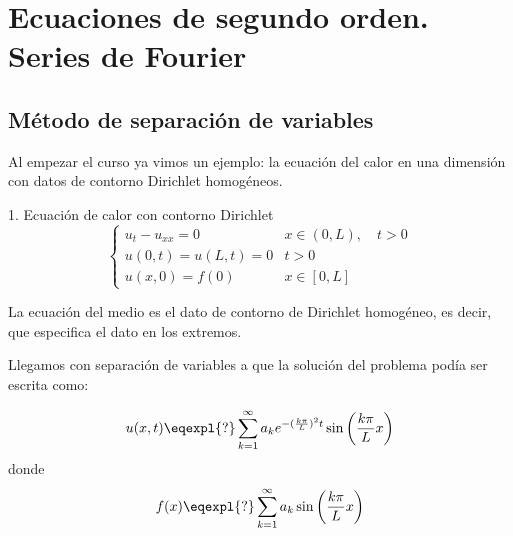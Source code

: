 \chapter{Ecuaciones de segundo orden. Series de Fourier}
\label{chap:EcuacionesSegundoOrden}

\section{Método de separación de variables}

	Al empezar el curso ya vimos un ejemplo: la ecuación del calor en una dimensión con datos de contorno Dirichlet homogéneos.

	\begin{example}{1. Ecuación de calor con contorno Dirichlet}
		\[
		\begin{cases}
		u_t - u_{xx} = 0 & x \in (0,L), \quad t > 0 \\
		u(0,t) = u(L,t) = 0 & t > 0 \\
		u(x,0) = f(0) & x \in [0,L]
		\end{cases}
		\]

		La ecuación del medio es el dato de contorno de Dirichlet homogéneo, es decir, que especifica el dato en los extremos.

		Llegamos con separación de variables a que la solución del problema podía ser escrita como:

		\[ u(x,t) \eqexpl{?} \sum^{\infty}_{k=1} a_k e^{-(\frac{k\pi}{L})^2 t} \sin \left( \frac{k\pi}{L} x \right) \]
		donde
		\[ f(x) \eqexpl{?} \sum^{\infty}_{k=1} a_k \sin \left( \frac{k\pi}{L}x \right) \]
	\end{example}


